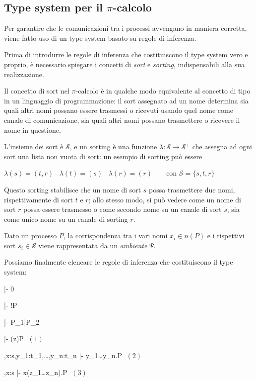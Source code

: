\subsection{Type system per il \texorpdfstring{$\pi$}{pi}-calcolo}

Per garantire che le comunicazioni tra i processi avvengano in maniera
corretta, viene fatto uso di un type system basato su regole di
inferenza\cite{qw05}.

Prima di introdurre le regole di inferenza che costituiscono il type system
vero e proprio, \`e necessario spiegare i concetti di \emph{sort} e
\emph{sorting}, indispensabili alla sua realizzazione.

Il concetto di sort nel $\pi$-calcolo \`e in qualche modo equivalente al
concetto di tipo in un linguaggio di programmazione: il sort assegnato ad un
nome determina sia quali altri nomi possano essere trasmessi o ricevuti usando
quel nome come canale di comunicazione, sia quali altri nomi possano
trasmettere o ricevere il nome in questione.

L'insieme dei sort \`e $\mathcal{S}$, e un sorting \`e una funzione
$\lambda : \mathcal{S} \rightarrow \mathcal{S}^{+}$ che assegna ad ogni sort
una lista non vuota di sort: un esempio di sorting pu\`o essere

\begin{pilisting}
$
    \lambda(s) = (t,r) \;\;\;
    \lambda(t) = (s)   \;\;\;
    \lambda(r) = (r)   \;\;\;\;\;\;
$
con $\mathcal{S} = \{s,t,r\}$
\end{pilisting}

Questo sorting stabilisce che un nome di sort $s$ possa trasmettere due
nomi, rispettivamente di sort $t$ e $r$; allo stesso modo, si pu\`o vedere
come un nome di sort $r$ possa essere trasmesso o come secondo nome su un
canale di sort $s$, sia come unico nome su un canale di sorting $r$.

Dato un processo $P$, la corrispondenza tra i vari nomi $x_i \in n(P)$ e
i rispettivi sort $s_i \in \mathcal{S}$ viene rappresentata da un
\emph{ambiente} $\Psi$.

Possiamo finalmente elencare le regole di inferenza che costituiscono il
type system:

\begin{pilisting}
\inference[nil ]
  {}
  {\Psi |- 0}

\vspace{3mm}
\indent
{}
  {\Psi |- !P}

\vspace{3mm}
\indent
{}
  {\Psi |- P_1|P_2}

\vspace{3mm}
\indent
{}
  {\Psi |- (z)P}
$\; (1)$

\vspace{3mm}
\indent
{}
  {\Psi,x:s,y_1:t_1,\ldots,y_n:t_n |- \langle y_1\ldots y_n\rangle.P}
$\; (2)$

\vspace{3mm}
\indent
{}
  {\Psi,x:s |- x(z_1\ldots z_n).P}
$\; (3)$
\end{pilisting}

